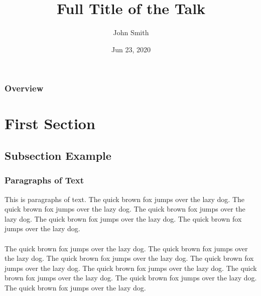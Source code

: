 \documentclass[notheorems,11pt,xcolor=table]{beamer}
\title[Short title]{Full Title of the Talk} %
\author{John Smith} %
\institute[NU] %
{
Name of University \\ %
\medskip
\textit{name@email.com} %
}
\date[2020.6.23]{Jun 23, 2020} %
\numberwithin{theorem}{section}
\numberwithin{definition}{section}
\numberwithin{lemma}{section}
\theoremstyle{example}
\numberwithin{figure}{section}
\numberwithin{table}{section}
\numberwithin{equation}{section}
\begin{document}

\begin{frame}
\titlepage %
\end{frame}


\begin{frame}
\frametitle{Overview} %
\tableofcontents[hideallsubsections] %
\end{frame}


\section{First Section} %

\subsection{Subsection Example} %

\begin{frame}
\frametitle{Paragraphs of Text}
This is paragraphs of text. The quick brown fox jumps over the lazy dog. The quick brown fox jumps over the lazy dog. The quick brown fox jumps over the lazy dog. The quick brown fox jumps over the lazy dog. The quick brown fox jumps over the lazy dog. \\~\\

The quick brown fox jumps over the lazy dog. The quick brown fox jumps over the lazy dog. The quick brown fox jumps over the lazy dog. The quick brown fox jumps over the lazy dog. The quick brown fox jumps over the lazy dog. The quick brown fox jumps over the lazy dog. The quick brown fox jumps over the lazy dog. The quick brown fox jumps over the lazy dog.
\end{frame}
\end{document}
